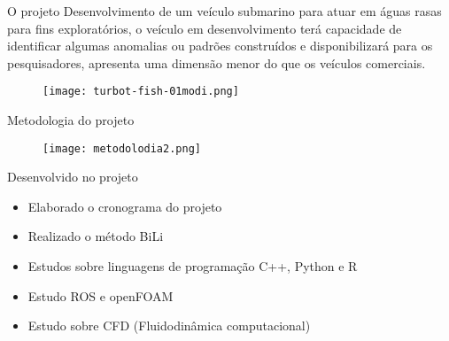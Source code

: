 
\begin{frame}[c]{O projeto}
    Desenvolvimento de um veículo submarino para atuar em águas rasas para fins exploratórios,
    o veículo em desenvolvimento terá capacidade de identificar algumas anomalias ou padrões construídos
    e disponibilizará para os pesquisadores, apresenta uma dimensão menor do que os veículos comerciais.
    \begin{figure}
        \texttt{[image: turbot-fish-01modi.png]}
    \end{figure}
    
\end{frame}
\begin{frame}[c]{Metodologia do projeto }
        \begin{figure}
        \texttt{[image: metodolodia2.png]}
    \end{figure}
\end{frame}
\begin{frame}[t]{Desenvolvido no projeto}
    \begin{itemize}
        \item Elaborado o cronograma do projeto
        \item Realizado o método BiLi
        \item Estudos sobre linguagens de programação C++, Python e R
        \item Estudo ROS e openFOAM
        \item Estudo sobre CFD (Fluidodinâmica computacional)
    \end{itemize}    
\end{frame}
